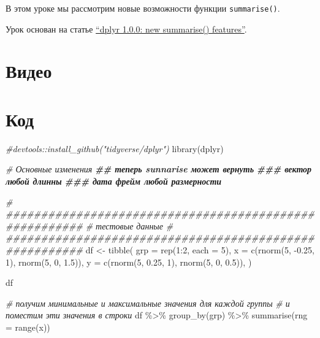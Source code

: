 \documentclass[
]{book}
\newenvironment{Shaded}{\begin{snugshade}}{\end{snugshade}}
\newcommand{\AttributeTok}[1]{\textcolor[rgb]{0.77,0.63,0.00}{#1}}
\newcommand{\CommentTok}[1]{\textcolor[rgb]{0.56,0.35,0.01}{\textit{#1}}}
\newcommand{\DecValTok}[1]{\textcolor[rgb]{0.00,0.00,0.81}{#1}}
\newcommand{\DocumentationTok}[1]{\textcolor[rgb]{0.56,0.35,0.01}{\textbf{\textit{#1}}}}
\newcommand{\FloatTok}[1]{\textcolor[rgb]{0.00,0.00,0.81}{#1}}
\newcommand{\FunctionTok}[1]{\textcolor[rgb]{0.00,0.00,0.00}{#1}}
\newcommand{\NormalTok}[1]{#1}
\newcommand{\OtherTok}[1]{\textcolor[rgb]{0.56,0.35,0.01}{#1}}
\newcommand{\SpecialCharTok}[1]{\textcolor[rgb]{0.00,0.00,0.00}{#1}}
\begin{document}
В этом уроке мы рассмотрим новые возможности функции \texttt{summarise()}.

Урок основан на статье \href{https://www.tidyverse.org/blog/2020/03/dplyr-1-0-0-summarise/}{``dplyr 1.0.0: new summarise() features''}.

\hypertarget{ux432ux438ux434ux435ux43e-3}{%
\section{Видео}\label{ux432ux438ux434ux435ux43e-3}}

\hypertarget{ux43aux43eux434-3}{%
\section{Код}\label{ux43aux43eux434-3}}

\begin{Shaded}
\begin{Highlighting}[]
\CommentTok{\#devtools::install\_github("tidyverse/dplyr")}
\FunctionTok{library}\NormalTok{(dplyr)}

\CommentTok{\# Основные изменения}
\DocumentationTok{\#\# теперь sunnarise может вернуть}
\DocumentationTok{\#\#\# вектор любой длинны}
\DocumentationTok{\#\#\# дата фрейм любой размерности}

\CommentTok{\# \#\#\#\#\#\#\#\#\#\#\#\#\#\#\#\#\#\#\#\#\#\#\#\#\#\#\#\#\#\#\#\#\#\#\#\#\#\#\#\#\#\#\#\#\#\#\#\#\#\#\#\#\#\#\#}
\CommentTok{\# тестовые данные}
\CommentTok{\# \#\#\#\#\#\#\#\#\#\#\#\#\#\#\#\#\#\#\#\#\#\#\#\#\#\#\#\#\#\#\#\#\#\#\#\#\#\#\#\#\#\#\#\#\#\#\#\#\#\#\#\#\#\#\#}
\NormalTok{df }\OtherTok{\textless{}{-}} \FunctionTok{tibble}\NormalTok{(}
  \AttributeTok{grp =} \FunctionTok{rep}\NormalTok{(}\DecValTok{1}\SpecialCharTok{:}\DecValTok{2}\NormalTok{, }\AttributeTok{each =} \DecValTok{5}\NormalTok{), }
  \AttributeTok{x =} \FunctionTok{c}\NormalTok{(}\FunctionTok{rnorm}\NormalTok{(}\DecValTok{5}\NormalTok{, }\SpecialCharTok{{-}}\FloatTok{0.25}\NormalTok{, }\DecValTok{1}\NormalTok{), }\FunctionTok{rnorm}\NormalTok{(}\DecValTok{5}\NormalTok{, }\DecValTok{0}\NormalTok{, }\FloatTok{1.5}\NormalTok{)),}
  \AttributeTok{y =} \FunctionTok{c}\NormalTok{(}\FunctionTok{rnorm}\NormalTok{(}\DecValTok{5}\NormalTok{, }\FloatTok{0.25}\NormalTok{, }\DecValTok{1}\NormalTok{), }\FunctionTok{rnorm}\NormalTok{(}\DecValTok{5}\NormalTok{, }\DecValTok{0}\NormalTok{, }\FloatTok{0.5}\NormalTok{)),}
\NormalTok{)}

\NormalTok{df}

\CommentTok{\# получим минимальные и максимальные значения для каждой группы}
\CommentTok{\# и поместим эти значения в строки}
\NormalTok{df }\SpecialCharTok{\%\textgreater{}\%} 
  \FunctionTok{group\_by}\NormalTok{(grp) }\SpecialCharTok{\%\textgreater{}\%} 
  \FunctionTok{summarise}\NormalTok{(}\AttributeTok{rng =} \FunctionTok{range}\NormalTok{(x))}


\end{Highlighting}
\end{Shaded}
\end{document}
